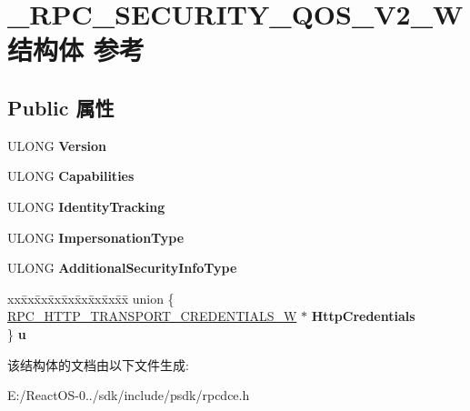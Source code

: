 \hypertarget{struct___r_p_c___s_e_c_u_r_i_t_y___q_o_s___v2___w}{}\section{\+\_\+\+R\+P\+C\+\_\+\+S\+E\+C\+U\+R\+I\+T\+Y\+\_\+\+Q\+O\+S\+\_\+\+V2\+\_\+\+W结构体 参考}
\label{struct___r_p_c___s_e_c_u_r_i_t_y___q_o_s___v2___w}
\subsection*{Public 属性}
\begin{DoxyCompactItemize}
\item 
\mbox{\label{struct___r_p_c___s_e_c_u_r_i_t_y___q_o_s___v2___w_aa7d51b261d16bd8b082c620c1c2be71f}} 
U\+L\+O\+NG {\bfseries Version}
\item 
\mbox{\label{struct___r_p_c___s_e_c_u_r_i_t_y___q_o_s___v2___w_a4d2646b85181444afc4e5ce202685820}} 
U\+L\+O\+NG {\bfseries Capabilities}
\item 
\mbox{\label{struct___r_p_c___s_e_c_u_r_i_t_y___q_o_s___v2___w_af9f18dadc2e2a0c26afe89ba4fc67e01}} 
U\+L\+O\+NG {\bfseries Identity\+Tracking}
\item 
\mbox{\label{struct___r_p_c___s_e_c_u_r_i_t_y___q_o_s___v2___w_a68e1bade963eaec84763ff0abb703a76}} 
U\+L\+O\+NG {\bfseries Impersonation\+Type}
\item 
\mbox{\label{struct___r_p_c___s_e_c_u_r_i_t_y___q_o_s___v2___w_abf37d8b4da35bb9164fabd0819a6d600}} 
U\+L\+O\+NG {\bfseries Additional\+Security\+Info\+Type}
\item 
\mbox{\label{struct___r_p_c___s_e_c_u_r_i_t_y___q_o_s___v2___w_ac40d10817f7bebba959a4bda8ceebde3}} 
\begin{tabbing}
xx\=xx\=xx\=xx\=xx\=xx\=xx\=xx\=xx\=\kill
union \{\\
\>\hyperlink{struct___r_p_c___h_t_t_p___t_r_a_n_s_p_o_r_t___c_r_e_d_e_n_t_i_a_l_s___w}{RPC\_HTTP\_TRANSPORT\_CREDENTIALS\_W} $\ast$ {\bfseries HttpCredentials}\\
\} {\bfseries u}\\

\end{tabbing}\end{DoxyCompactItemize}


该结构体的文档由以下文件生成\+:\begin{DoxyCompactItemize}
\item 
E\+:/\+React\+O\+S-\/0../sdk/include/psdk/rpcdce.\+h\end{DoxyCompactItemize}
